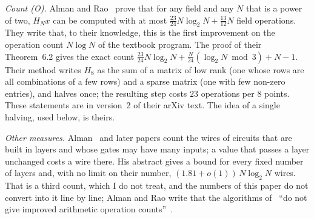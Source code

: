 \documentclass[10pt]{article}
\theoremstyle{remark}
\newcommand{\cntO}{\textup{(O)}}
\renewcommand{\lg}{\log_2}
\begin{document}
\emph{Count \cntO.} Alman and Rao~\cite[Theorem~1.1]{AR} prove that for any field and any $N$ that is a power
of two, $H_N x$ can be computed with at most $\tfrac{23}{24}N\lg N+\tfrac{13}{12}N$ field operations. They
write that, to their knowledge, this is the first improvement on the operation count $N\log N$ of the
textbook program. The proof of their Theorem~6.2 gives the exact count
$\tfrac{23}{24}N\lg N+\tfrac{N}{24}(\lg N \bmod 3)+N-1$. Their method writes $H_8$ as the sum of a matrix
of low rank (one whose rows are all combinations of a few rows) and a sparse matrix (one with few non-zero
entries), and halves once; the resulting step costs $23$ operations per $8$ points. These
statements are in version~2 of their arXiv text. The idea of a single halving, used below, is theirs.

\emph{Other measures.} Alman~\cite{Alman} and later papers count the wires of circuits that are built in
layers and whose gates may have many inputs; a value that passes a layer unchanged costs a wire there. His
abstract gives a bound for every fixed number of layers and, with no limit on their number,
$(1.81+o(1))\,N\lg N$ wires. That is a third count, which I do not treat, and the numbers of this paper do
not convert into it line by line; Alman and Rao write
that the algorithms of~\cite{Alman} ``do not give improved arithmetic operation counts''~\cite{AR}.
\end{document}
